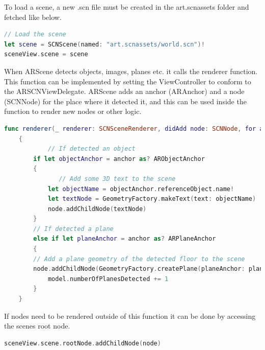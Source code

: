 To load a scene, a new .scn file must be created in the art.scnassets folder and fetched like below.
\begin{lstlisting}[language=swift]
// Load the scene
let scene = SCNScene(named: "art.scnassets/world.scn")!        
sceneView.scene = scene
\end{lstlisting}

When ARScene detects objects, images, planes etc. it calls the renderer function. This function can be implemented by setting the ViewController to conform to the ARSCNViewDelegate. ARScene adds an anchor (ARAnchor) and a node (SCNNode) for the place where it detected it, and this can be used inside the function to render new nodes or other logic.

\begin{lstlisting}[language=swift]
func renderer(_ renderer: SCNSceneRenderer, didAdd node: SCNNode, for anchor: ARAnchor)
    {
    	    // If detected an object
        if let objectAnchor = anchor as? ARObjectAnchor
        {
        	   // Add some 3D text to the scene
            let objectName = objectAnchor.referenceObject.name!
            let textNode = GeometryFactory.makeText(text: objectName)
            node.addChildNode(textNode)
        }
        // If detected a plane
        else if let planeAnchor = anchor as? ARPlaneAnchor
        {
        // Add a plane geometry of the detected floor to the scene
        node.addChildNode(GeometryFactory.createPlane(planeAnchor: planeAnchor, metalDevice: metalDevice!))
            model.numberOfPlanesDetected += 1
        }
    }
\end{lstlisting}

If nodes need to be rendered outside of this function it can be done by accessing the
scenes root node.

\begin{lstlisting}[language=swift]
sceneView.scene.rootNode.addChildNode(node)
\end{lstlisting}


\newpage